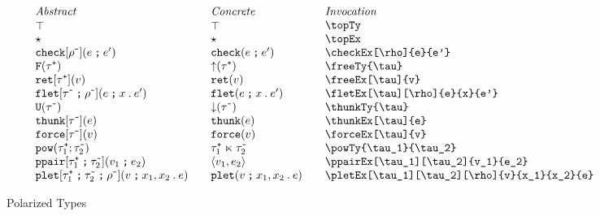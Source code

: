 \documentclass[11pt]{article}
\begin{document}
\begin{figure}

  \begin{small}
    \begin{displaymath}
      \begin{array}{l@{\qquad}l@{\qquad}l@{\qquad}l}
        \textit{Abstract} & \textit{Concrete} & \textit{Invocation} \\
        \topTy                                        & \topTy*                   & \verb|\topTy| \\
        \topEx                                        & \topEx*                   & \verb|\topEx| \\
        \chckEx[\negTy{\rho}]{e}{e'}                 & \chckEx*{e}{e'}          & \verb|\checkEx[\rho]{e}{e'}| \\
        \freeTy{\posTy{\tau}}                         & \freeTy*{\posTy{\tau}}    & \verb|\freeTy{\tau}|                         \\
        \freeEx[\posTy{\tau}]{v}                      & \freeEx*[\posTy{\tau}]{v} & \verb|\freeEx[\tau]{v}|                      \\
        \fletEx[\negTy{\tau}][\negTy{\rho}]{e}{x}{e'} & \fletEx*{e}{x}{e'}        & \verb|\fletEx[\tau][\rho]{e}{x}{e'}| \\
        \thunkTy{\negTy{\tau}}                        & \thunkTy*{\negTy{\tau}}   & \verb|\thunkTy{\tau}|                        \\
        \thunkEx[\negTy{\tau}]{e}                     & \thunkEx*{e}              & \verb|\thunkEx[\tau]{e}|                     \\
        \forceEx[\negTy{\tau}]{v}                     & \forceEx*{v}              & \verb|\forceEx[\tau]{v}| \\
        \powTy{\posTy{\tau_1}}{\negTy{\tau_2}}            & \powTy*{\posTy{\tau_1}}{\negTy{\tau_2}}             & \verb|\powTy{\tau_1}{\tau_2}| \\
        \ppairEx[\posTy{\tau_1}][\negTy{\tau_2}]{v_1}{e_2}                                & \ppairEx*{v_1}{e_2}           & \verb|\ppairEx[\tau_1][\tau_2]{v_1}{e_2}| \\
        \pletEx{v}{x_1}{x_2}{e}                       & \pletEx*{v}{x_1}{x_2}{e}  & \verb|\pletEx[\tau_1][\tau_2][\rho]{v}{x_1}{x_2}{e}|
      \end{array}
    \end{displaymath}
  \end{small}

  \caption{Polarized Types}
  \label{fig:pol}
\end{figure}
\end{document}

